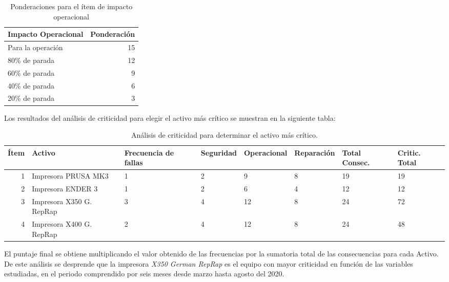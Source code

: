 \begin{table}[H]
  \centering
  
    \begin{tabular}{|l|r|}
    \hline
    Impacto Operacional & \multicolumn{1}{l|}{Ponderación } \\
    \hline
    Para la operación & 15 \\
    \hline
    80\% de parada & 12 \\
    \hline
    60\% de parada & 9 \\
    \hline
    40\% de parada & 6 \\
    \hline
    20\% de parada & 3 \\
    \hline
    \end{tabular}%
    \caption{Ponderaciones para el ítem de impacto operacional}
  \label{tab:addlabel}%
\end{table}%

Los resultados del análisis de criticidad para elegir el activo más crítico se muestran en la siguiente tabla:

\begin{table}[H]
  \centering
  
    \begin{tabular}{|r|p{2cm}|p{1cm}|p{1cm}|p{1cm}|p{1cm}|p{1cm}|p{1cm}|}
    \hline
    \multicolumn{1}{|l|}{Ítem} & Activo & \multicolumn{1}{p{1.5cm}|}{Frecuencia de fallas} & \multicolumn{1}{p{1.5cm}|}{Seguridad} & \multicolumn{1}{p{1.5cm}|}{Operacional} & \multicolumn{1}{p{1.5cm}|}{Reparación} & \multicolumn{1}{p{1cm}|}{Total Consec.} & \multicolumn{1}{p{1cm}|}{Critic. Total} \\
    \hline
    1     & Impresora PRUSA MK3 & 1 & 2& 9 & 8& 19& 19 \\
    \hline
    2     & Impresora ENDER 3 & 1  & 2 & 6 & 4 & 12 & 12 \\
    \hline
    3     & Impresora X350 G. RepRap & 3& 4 & 12 & 8  & 24 & 72 \\
    \hline
    4     & Impresora X400 G. RepRap & 2 & 4 & 12 & 8 & 24 & 48 \\
    \hline
    \end{tabular}%
    \caption{Análisis de criticidad para determinar el activo más crítico.}
  \label{tab:addlabel}%
\end{table}%

El puntaje final se obtiene multiplicando el valor obtenido de las frecuencias por la sumatoria total de las consecuencias para cada Activo. De este análisis se desprende que la impresora \textit{X350 German RepRap} es el equipo con mayor criticidad en función de las variables estudiadas, en el periodo comprendido por seis meses desde marzo hasta agosto del 2020.


